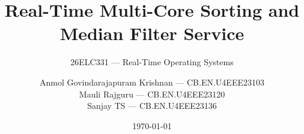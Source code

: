%

\usepackage[T1]{fontenc}
\usepackage{lmodern}
\usepackage{tikz}
\usetikzlibrary{arrows.meta, positioning, calc, fit, backgrounds, shapes.geometric}
\usepackage[most]{tcolorbox}
\usepackage{booktabs}
\usepackage{listings}
\usepackage{amsmath,amssymb}
\usepackage{xcolor}


\title[RT-MOMS]{Real-Time Multi-Core Sorting and Median Filter Service}
\subtitle{26ELC331 — Real-Time Operating Systems}
\date{\today}

\newcommand{\authOne}{Anmol Govindarajapuram Krishnan — CB.EN.U4EEE23103}
\newcommand{\authTwo}{Mauli Rajguru — CB.EN.U4EEE23120}
\newcommand{\authThree}{Sanjay TS — CB.EN.U4EEE23136}
\newcommand{\authorsBlock}{\authOne\\ \authTwo\\ \authThree}

\author[A. Krishnan, M. Rajguru, S. TS]{\authorsBlock}
